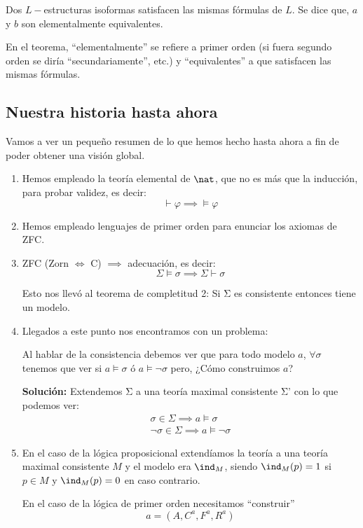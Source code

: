 \begin{theorem}
	Dos $L-$estructuras isoformas satisfacen las mismas fórmulas de $L$. Se dice que, $a$ y $b$ son elementalmente equivalentes.
\end{theorem}
En el teorema, ``elementalmente'' se refiere a primer orden (si fuera segundo orden se diría ``secundariamente'', etc.) y ``equivalentes'' a que satisfacen las mismas fórmulas.

\subsection{Nuestra historia hasta ahora}
Vamos a ver un pequeño resumen de lo que hemos hecho hasta ahora a fin de poder obtener una visión global.

\begin{enumerate}
\item Hemos empleado la teoría elemental de $\nat$, que no es más que la inducción, para probar validez, es decir:
\[\vdash \varphi \implies \vDash \varphi\]

\item Hemos empleado lenguajes de primer orden para enunciar los axiomas de ZFC.

\item ZFC (Zorn $\iff$ C) $\implies$ adecuación, es decir:
\[Σ \models σ \implies Σ \vdash σ\]

\obs Esto nos llevó al teorema de completitud 2: Si Σ es consistente entonces tiene un modelo.

\item Llegados a este punto nos encontramos con un problema:

Al hablar de la consistencia debemos ver que para todo modelo $a$, $\forall σ$ tenemos que ver si $a \models σ$ ó $a \models \neg σ$ pero, ¿Cómo construimos $a$?

\textbf{Solución:} Extendemos Σ a una teoría maximal consistente Σ' con lo que podemos ver:
\[\begin{array}{l}σ \in Σ \implies a \models σ \\ \neg σ\in Σ \implies a \models \neg σ\end{array}\]

\item En el caso de la lógica proposicional extendíamos la teoría a una teoría maximal consistente $M$ y el modelo era $\ind_M$, siendo $\ind_M(p)=1$ si $p \in M$ y $\ind_M(p)=0$ en caso contrario.

En el caso de la lógica de primer orden necesitamos ``construir''
\[a = (A,C^a,F^a,R^a)\]


\end{enumerate}
